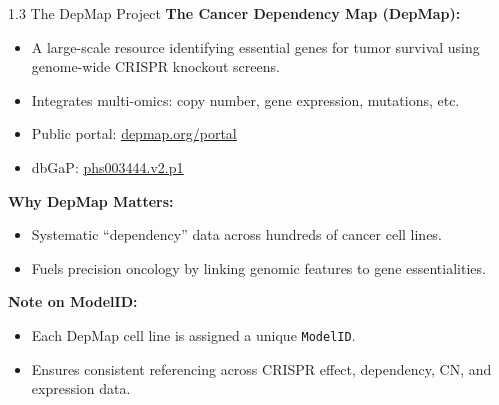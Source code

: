 \documentclass[10pt]{beamer}
\let\oldhref\href
\renewcommand{\href}[2]{\oldhref{#1}{\uline{#2}}}
\begin{document}
\begin{frame}{1.3 The DepMap Project}
  \textbf{The Cancer Dependency Map (DepMap):}
  \begin{itemize}
    \item A large-scale resource identifying essential genes for tumor survival
          using genome-wide CRISPR knockout screens.
    \item Integrates multi-omics: copy number, gene expression, mutations, etc.
    \item Public portal: \href{https://depmap.org/portal/}{depmap.org/portal}
    \item dbGaP: \href{https://www.ncbi.nlm.nih.gov/projects/gap/cgi-bin/study.cgi?study_id=phs003444.v2.p1}{phs003444.v2.p1}
  \end{itemize}

  \vspace{0.3cm}
  \textbf{Why DepMap Matters:}
  \begin{itemize}
    \item Systematic “dependency” data across hundreds of cancer cell lines.
    \item Fuels precision oncology by linking genomic features to gene essentialities.
  \end{itemize}

  \vspace{0.2cm}
  \textbf{Note on ModelID:}
  \begin{itemize}
    \item Each DepMap cell line is assigned a unique \texttt{ModelID}.
    \item Ensures consistent referencing across CRISPR effect, dependency, CN, and expression data.
  \end{itemize}
\end{frame}
\end{document}
